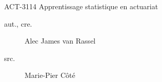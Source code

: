 \begin{contrib}{ACT-3114\: Apprentissage statistique en actuariat}
\begin{description}
	\item[aut., cre.] Alec James van Rassel
	\item[src.] Marie-Pier Côté
\end{description}
\end{contrib}